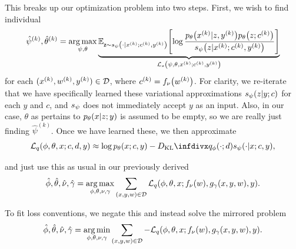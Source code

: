 This breaks up our optimization problem into two steps. First, we wish to find individual
\begin{equation}
    \hat\psi^{(k)}, \hat\theta^{(k)} = \argmax_{\psi,\theta} \underbrace{\EX{\rz\sim\svd{\cdot\given x^{(k)};c^{(k)}, y^{(k)}}}{\log\frac{\pld{x^{(k)}\given z, y^{(k)}}\pld{z;c^{(k)}}}{\svd{z\given x^{(k)};c^{(k)}, y^{(k)}}}}  }_{\elbo{s}{\psi, \theta, x^{(k)}; c^{(k)}, y^{(k)}}}
\end{equation}
for each $(x^{(k)},w^{(k)}, y^{(k)})\in\mathcal D$, where $c^{(k)}=\fvd{w^{(k)}}$. For clarity, we re-iterate that we have specifically learned these variational approximations $\svd{z\given y;c}$ for each $y$ and $c$, and $s_{\psi}$ does not immediately accept $y$ as an input. Also, in our case, $\theta$ as pertains to $\pld{x\given z;y}$ is assumed to be empty, so we are really just finding $\hat\psi^{(k)}$. Once we have learned these, we then approximate
\begin{equation}
    \elbo{q}{\phi,\theta,x;c,d,y}\approx \log \pld{x;c,y} - \DKL{\qvd{\cdot ; d}}{\svd{\cdot \given x;c,y}},
\end{equation}

and just use this as usual in our previously derived
\begin{equation}
    \hat\phi,\hat\theta,\hat\nu,\hat\gamma = \argmax_{\phi,\theta,\nu,\gamma} \sum_{(x,y,w)\in \Data} \elbo{q}{\phi,\theta,x;\fvd{w},\gvd{x,y,w},y}.
\end{equation}

\begin{proposition}
    To fit loss conventions, we negate this and instead solve the mirrored problem
    \begin{equation}
        \hat\phi,\hat\theta,\hat\nu,\hat\gamma = \argmin_{\phi,\theta,\nu,\gamma} \sum_{(x,y,w)\in \Data} -\elbo{q}{\phi,\theta,x;\fvd{w},\gvd{x,y,w},y}.
    \end{equation}    
\end{proposition}


